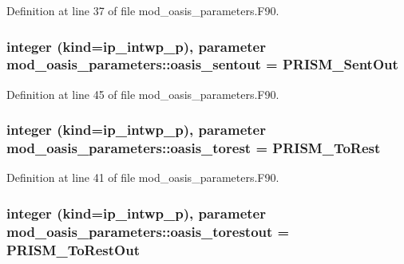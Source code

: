 Definition at line 37 of file mod\+\_\+oasis\+\_\+parameters.\+F90.

\hypertarget{classmod__oasis__parameters_a1804e9b27d8d7ace38fd4c3f99ade6dd}{
\subsubsection[{oasis\+\_\+sentout}]{\setlength{\rightskip}{0pt plus 5cm}integer (kind=ip\+\_\+intwp\+\_\+p), parameter mod\+\_\+oasis\+\_\+parameters\+::oasis\+\_\+sentout = P\+R\+I\+S\+M\+\_\+\+Sent\+Out}}\label{classmod__oasis__parameters_a1804e9b27d8d7ace38fd4c3f99ade6dd}


Definition at line 45 of file mod\+\_\+oasis\+\_\+parameters.\+F90.

\hypertarget{classmod__oasis__parameters_a875abcc1cc679cb72f20d42d3dbfac97}{
\subsubsection[{oasis\+\_\+torest}]{\setlength{\rightskip}{0pt plus 5cm}integer (kind=ip\+\_\+intwp\+\_\+p), parameter mod\+\_\+oasis\+\_\+parameters\+::oasis\+\_\+torest = P\+R\+I\+S\+M\+\_\+\+To\+Rest}}\label{classmod__oasis__parameters_a875abcc1cc679cb72f20d42d3dbfac97}


Definition at line 41 of file mod\+\_\+oasis\+\_\+parameters.\+F90.

\hypertarget{classmod__oasis__parameters_a390018877602efede436bd0721add299}{
\subsubsection[{oasis\+\_\+torestout}]{\setlength{\rightskip}{0pt plus 5cm}integer (kind=ip\+\_\+intwp\+\_\+p), parameter mod\+\_\+oasis\+\_\+parameters\+::oasis\+\_\+torestout = P\+R\+I\+S\+M\+\_\+\+To\+Rest\+Out}}\label{classmod__oasis__parameters_a390018877602efede436bd0721add299}


